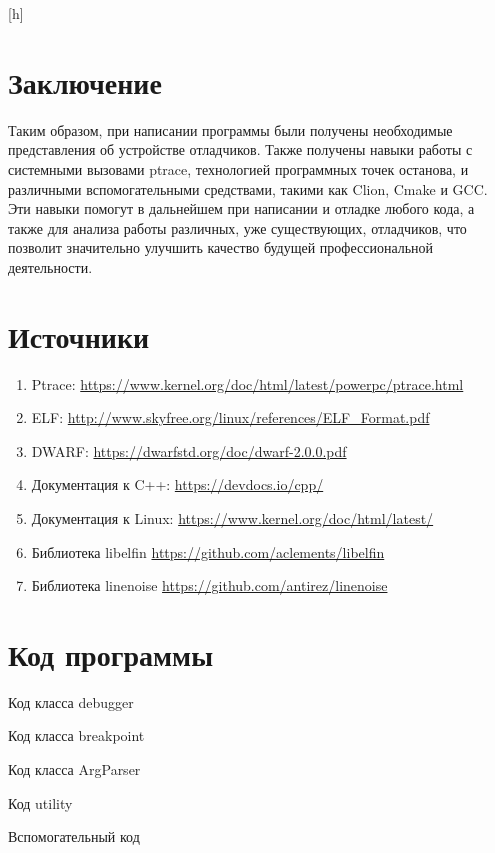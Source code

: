 \documentclass[oneside,final,14pt]{extreport}
\makeatletter
\renewenvironment{figure}[1][\fps@figure]{
	\edef\@tempa{\noexpand\@float{figure}[#1]}
	\@tempa
	\addtocounter{figurecounter}{1}
}{
	\end@float
}
\makeatother
\begin{document}
\begin{figure}[h]
	\centering
	\begin{singlespacing}
		
	\end{singlespacing}
	\caption{Шаг без захода}
\end{figure}


\chapter{Заключение}
Таким образом, при написании программы были получены необходимые представления об устройстве отладчиков. Также получены навыки работы с системными вызовами ptrace, технологией программных точек останова, и различными вспомогательными средствами, такими как Clion, Cmake и GCC. Эти навыки помогут в дальнейшем при написании и отладке любого кода, а также для анализа работы различных, уже существующих, отладчиков, что позволит значительно улучшить качество будущей профессиональной деятельности.

\chapter{Источники}
\begin{enumerate}
	\item Ptrace: \url{ https://www.kernel.org/doc/html/latest/powerpc/ptrace.html}
	\item ELF: \url{ http://www.skyfree.org/linux/references/ELF_Format.pdf}
	\item DWARF: \url{ https://dwarfstd.org/doc/dwarf-2.0.0.pdf}
	\item Документация к C++:  \url{https://devdocs.io/cpp/}
	\item Документация к Linux: \url{ https://www.kernel.org/doc/html/latest/}
	\item Библиотека libelfin \url {https://github.com/aclements/libelfin}
	\item Библиотека linenoise \url {https://github.com/antirez/linenoise}
\end{enumerate}




\appendix
\chapter{Код программы}
\centerline{Код класса debugger}


\centerline{Код класса breakpoint}


\centerline{Код класса ArgParser}


\centerline{Код utility}


\centerline{Вспомогательный код}


\end{document}
